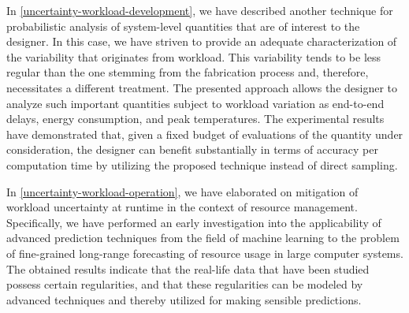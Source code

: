 In \cref{uncertainty-workload-development}, we have described another technique
for probabilistic analysis of system-level quantities that are of interest to
the designer. In this case, we have striven to provide an adequate
characterization of the variability that originates from workload. This
variability tends to be less regular than the one stemming from the fabrication
process and, therefore, necessitates a different treatment. The presented
approach allows the designer to analyze such important quantities subject to
workload variation as end-to-end delays, energy consumption, and peak
temperatures. The experimental results have demonstrated that, given a fixed
budget of evaluations of the quantity under consideration, the designer can
benefit substantially in terms of accuracy per computation time by utilizing the
proposed technique instead of direct sampling.

In \cref{uncertainty-workload-operation}, we have elaborated on mitigation of
workload uncertainty at runtime in the context of resource management.
Specifically, we have performed an early investigation into the applicability of
advanced prediction techniques from the field of machine learning to the problem
of fine-grained long-range forecasting of resource usage in large computer
systems. The obtained results indicate that the real-life data that have been
studied possess certain regularities, and that these regularities can be modeled
by advanced techniques and thereby utilized for making sensible predictions.
